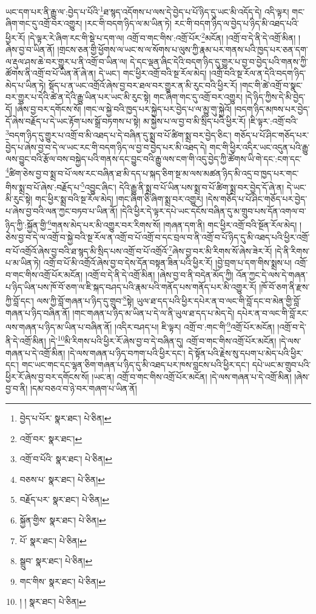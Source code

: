ཡང་དག་པར་ནི་རྒྱུ་ལ་:བྱེད་པ་པོའི་\footnote{བྱེད་པ་པོར་  སྣར་ཐང་།  པེ་ཅིན། }ཐ་སྙད་འདོགས་པ་ལས་དེ་བྱེད་པ་པོ་ཉིད་དུ་ཡང་མི་འདོད་དེ། འདི་ལྟར། གང་ཞིག་གང་དུ་འགྲོ་བར་འགྱུར། །རང་གི་བདག་ཉིད་ལ་མ་ཡིན་ཏེ། རང་གི་བདག་ཉིད་ལ་བྱེད་པ་ཉིད་མི་འཐད་པའི་ཕྱིར་རོ། །དེ་ལྟར་རེ་ཞིག་རང་གི་སྡེ་པ་དག་ལ། འགྲོ་བ་གང་གིས་:འགྲོ་པོར་\footnote{འགྲོ་བར་  སྣར་ཐང་། }མངོན། །འགྲོ་བ་དེ་ནི་དེ་འགྲོ་མིན། །ཞེས་བྱ་བ་ཡིན་ནོ། །གྲངས་ཅན་གྱི་ཕྱོགས་ལ་ཡང་ས་ལ་སོགས་པ་ལུས་ཀྱི་རྣམ་པར་གནས་པའི་ཁྱད་པར་ཅན་དག་ལ་རྡུལ་ཤས་ཆེ་བར་གྱུར་པ་ནི་འགྲོ་བ་ཡིན་ལ། དེ་དང་ལྡན་ཞིང་དེའི་བདག་ཉིད་དུ་གྱུར་པ་བྱ་བ་བྱེད་པའི་གནས་ཀྱི་ཚོགས་ནི་འགྲོ་བ་པོ་ཡིན་ནོ་ཞེ་ན། དེ་ཡང་། གང་ཕྱིར་འགྲོ་བའི་སྔ་རོལ་མེད། །འགྲོ་བའི་སྔ་རོལ་ན་དེའི་བདག་ཉིད་མེད་པ་ཡིན་ཏེ། སྡོད་པ་ན་ཡང་འགྲོའོ་ཞེས་བྱ་བར་ཐལ་བར་གྱུར་ན་མི་རུང་བའི་ཕྱིར་རོ། །གང་གི་ཚེ་འགྲོ་བ་སྣང་བར་གྱུར་པ་དེའི་ཚེ་ན་དེའི་རྒྱུ་ཡིན་པར་ཡང་མི་རུང་སྟེ། གང་ཞིག་གང་དུ་འགྲོ་བར་འགྱུར། །དེ་ཉིད་ཀྱིས་དེ་མི་བྱེད་དོ། །ཞེས་བྱ་བར་དགོངས་སོ། །གང་ལ་སྐྱེ་བའི་ཁྱད་པར་སྐྱེད་པར་བྱེད་པ་ལ་མྱུ་གུ་སྐྱེའོ། །བདག་ཉིད་མཁས་པར་བྱེད་དོ་ཞེས་བརྗོད་པ་དེ་ཡང་རྟོག་པས་སྒྲོ་བཏགས་པ་སྟེ། མ་སྐྱེས་པ་ལ་བྱ་བ་མི་སྲིད་པའི་ཕྱིར་རོ། །ཇི་ལྟར་:འགྲོ་བའི་\footnote{འགྲོ་བ་པོའི་  སྣར་ཐང་།  པེ་ཅིན། }བདག་ཉིད་དུ་གྱུར་པ་འགྲོ་བ་མི་འཐད་པ་དེ་བཞིན་དུ་སྨྲ་བ་པོ་ཚིག་སྨྲ་བར་བྱེད་ཅིང་། གཅོད་པ་པོ་ཤིང་གཅོད་པར་བྱེད་པ་ཞེས་བྱ་བ་དེ་ལ་ཡང་རང་གི་བདག་ཉིད་ལ་བྱ་བ་བྱེད་པར་མི་འཐད་དེ། གང་གི་ཕྱིར་འདིར་ཡང་འདུན་པའི་རྒྱུ་ལས་བྱུང་བའི་རྩོལ་བས་བསྐྱེད་པའི་གནས་དང་བྱུང་བའི་རྒྱུ་ལས་ངག་གི་འདུ་བྱེད་ཀྱི་ཚོགས་ཡི་གེ་དང་:ངག་དང་\footnote{བཅས་པ་  སྣར་ཐང་།  པེ་ཅིན། }ཚིག་ཅེས་བྱ་བ་སྨྲ་བ་པོ་ལས་རང་བཞིན་ཐ་མི་དད་པ་སྐད་ཅིག་སྔ་མ་ལས་མཚན་ཉིད་མི་འདྲ་བ་ཁྱད་པར་གང་གིས་སྨྲ་བ་པོ་ཞེས་:བརྗོད་པ་\footnote{བརྗོད་པར་  སྣར་ཐང་།  པེ་ཅིན། }འབྱུང་ཞིང་། དེའི་རྒྱུ་ནི་སྨྲ་བ་པོ་ཡིན་པས་སྨྲ་བ་པོ་ཚིག་སྨྲ་བར་བྱེད་དོ་ཞེ་ན། དེ་ཡང་མི་རུང་སྟེ། གང་ཕྱིར་སྨྲ་བའི་སྔ་རོལ་མེད། །གང་ཞིག་ཅི་ཞིག་སྨྲ་བར་འགྱུར། །དེས་གཅོད་པ་པོ་ཤིང་གཅོད་པར་བྱེད་པ་ཞེས་བྱ་བའི་ལན་ཀྱང་བཏབ་པ་ཡིན་ནོ། །དེའི་ཕྱིར་དེ་ལྟར་དཔེ་ཡང་དངོས་བཞིན་དུ་མ་གྲུབ་པས་དོན་འགལ་བ་ཉིད་ཀྱི་:སྐྱོན་གྱི་\footnote{སྐྱོན་གྱིས་  སྣར་ཐང་།  པེ་ཅིན། }གནས་མེད་པར་མི་འགྱུར་བར་རིགས་སོ། །གཞན་དག་ནི། གང་ཕྱིར་འགྲོ་བའི་སྔོན་རོལ་མེད། །ཅེས་བྱ་བ་དེ་ལ་འགྲོ་བ་སྐྱེ་བའི་སྔ་རོལ་ན་འགྲོ་བ་པོ་འགྲོ་བ་དང་བྲལ་བ་ནི་འགྲོ་བ་པོ་ཉིད་དུ་མི་འཐད་པའི་ཕྱིར་འགྲོ་བ་པོ་འགྲོའོ་ཞེས་བྱ་བའི་ཐ་སྙད་མི་སྲིད་པས་འགྲོ་བ་པོ་འགྲོའོ་\footnote{པོ་  སྣར་ཐང་།  པེ་ཅིན། }ཞེས་བྱ་བར་མི་རིགས་སོ་ཞེས་ཟེར་རོ། །དེ་ནི་རིགས་པ་མ་ཡིན་ཏེ། འགྲོ་བ་པོ་མི་འགྲོའོ་ཞེས་བྱ་བ་དེས་དོན་བསྟན་ཟིན་པའི་ཕྱིར་རོ། །བྱེ་བྲག་པ་དག་གིས་སྨྲས་པ། འགྲོ་བ་གང་གིས་འགྲོ་པོར་མངོན། །འགྲོ་བ་དེ་ནི་དེ་འགྲོ་མིན། །ཞེས་བྱ་བ་ནི་བདེན་མོད་ཀྱི། འོན་ཀྱང་དེ་ལས་དེ་གཞན་པ་ཉིད་ཡིན་པས་ཁོ་བོ་ཅག་ལ་ཇི་སྐད་བཤད་པའི་རྣམ་པའི་གནོད་པས་གནོད་པར་མི་འགྱུར་རོ། །ཁོ་བོ་ཅག་ནི་རྫས་ཀྱི་བློ་དང་། ལས་ཀྱི་བློ་གཞན་པ་ཉིད་དུ་གྲུབ་\footnote{སྒྲུབ་  སྣར་ཐང་།  པེ་ཅིན། }སྟེ། ཡུལ་ཐ་དད་པའི་ཕྱིར་དཔེར་ན་བ་ལང་གི་བློ་དང་བ་མེན་གྱི་བློ་གཞན་པ་ཉིད་བཞིན་ནོ། །གང་གཞན་པ་ཉིད་མ་ཡིན་པ་དེ་ལ་ནི་ཡུལ་ཐ་དད་པ་མེད་དེ། དཔེར་ན་བ་ལང་གི་བློ་རང་ལས་གཞན་པ་ཉིད་མ་ཡིན་པ་བཞིན་ནོ། །འདིར་བཤད་པ། ཇི་ལྟར། འགྲོ་བ་:གང་གི་\footnote{གང་གིས་  སྣར་ཐང་།  པེ་ཅིན། }འགྲོ་པོར་མངོན། །འགྲོ་བ་དེ་ནི་དེ་འགྲོ་མིན། །དེ་\footnote{། །  སྣར་ཐང་།  པེ་ཅིན། }མི་རིགས་པའི་ཕྱིར་རོ་ཞེས་བྱ་བ་དེ་བཞིན་དུ། འགྲོ་བ་གང་གིས་འགྲོ་པོར་མངོན། །དེ་ལས་གཞན་པ་དེ་འགྲོ་མིན། །དེ་ལས་གཞན་པ་ཉིད་བཀག་པའི་ཕྱིར་དང་། དེ་སྟོན་པའི་རྗེས་སུ་དཔག་པ་མེད་པའི་ཕྱིར་དང་། གང་ཡང་གང་དང་ལྷན་ཅིག་གཞན་པ་ཉིད་དུ་མི་འཐད་པར་ཁས་བླངས་པའི་ཕྱིར་དང་། དཔེ་ཡང་མ་གྲུབ་པའི་ཕྱིར་རོ་ཞེས་བྱ་བར་དགོངས་སོ། །ཡང་ན། འགྲོ་བ་གང་གིས་འགྲོ་པོར་མངོན། །དེ་ལས་གཞན་པ་དེ་འགྲོ་མིན། །ཞེས་བྱ་བ་ནི། །དམ་བཅའ་བ་ཉེ་བར་གཞག་པ་ཡིན་ནོ། 